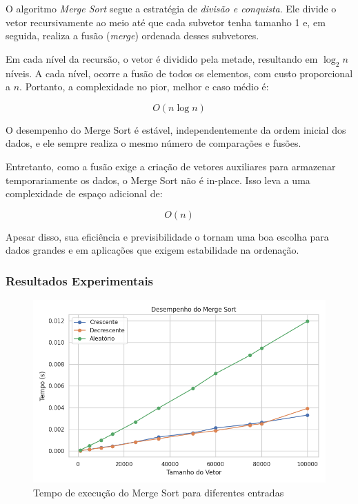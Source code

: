 O algoritmo \textit{Merge Sort} segue a estratégia de \textit{divisão e conquista}. Ele divide o vetor recursivamente ao meio até que cada subvetor tenha tamanho 1 e, em seguida, realiza a fusão (\textit{merge}) ordenada desses subvetores.

Em cada nível da recursão, o vetor é dividido pela metade, resultando em \(\log_2 n\) níveis. A cada nível, ocorre a fusão de todos os elementos, com custo proporcional a \(n\). Portanto, a complexidade no pior, melhor e caso médio é:

\[
O(n \log n)
\]

O desempenho do Merge Sort é estável, independentemente da ordem inicial dos dados, e ele sempre realiza o mesmo número de comparações e fusões.

Entretanto, como a fusão exige a criação de vetores auxiliares para armazenar temporariamente os dados, o Merge Sort não é in-place. Isso leva a uma complexidade de espaço adicional de:

\[
O(n)
\]

Apesar disso, sua eficiência e previsibilidade o tornam uma boa escolha para dados grandes e em aplicações que exigem
estabilidade na ordenação.~\cite{geeksforgeeks_merge_sort}

\subsubsection{Resultados Experimentais}
\begin{figure}[H]
    \centering
    \includegraphics[width=1\textwidth]{../codigos/resultados/merge_grafico.png}
    \caption{Tempo de execução do Merge Sort para diferentes entradas}
    \label{fig:merge-grafico}
\end{figure}

